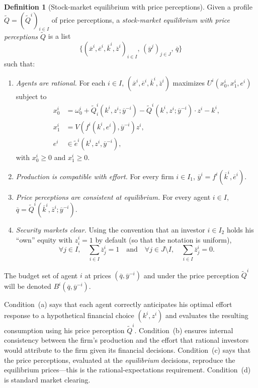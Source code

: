\documentclass[11pt,a4paper,oneside]{book}
\def\geq{\geqslant}
\def\et{\quad \text{and} \quad}
\theoremstyle{plain}
\theoremstyle{definition}
\newtheorem{definition}[theorem]{Definition}
\theoremstyle{remark}
\numberwithin{equation}{chapter}
\begin{document}
\begin{definition}[Stock-market equilibrium with price perceptions]\label{def:eq-PP}
Given a profile $\widetilde{Q} = (\widetilde{Q}^i)_{i \in I}$ of price perceptions, a \emph{stock-market equilibrium with price perceptions $\widetilde{Q}$} is a list
\begin{equation*}
  \bigl\{ (\overline{x}^i, \overline{e}^i, \overline{k}^i, \overline{z}^i)_{i \in I}, \, (\overline{y}^j)_{j \in J}, \, \overline{q} \bigr\}
\end{equation*}
such that:
\begin{enumerate}
  \item[(a)] \emph{Agents are rational.}
  For each $i \in I$, $(\overline{x}^i, \overline{e}^i, \overline{k}^i, \overline{z}^i)$ maximizes $U^i(x^i_0, x^i_1, e^i)$ subject to
  \begin{align*}
    x^i_0 &= \omega^i_0 + \widetilde{Q}^i_i(k^i, z^i; \overline{y}^{-i}) - \widetilde{Q}^i(k^i, z^i; \overline{y}^{-i}) \cdot z^i - k^i, \\
    x^i_1 &= V(f^i(k^i, e^i), \overline{y}^{-i}) z^i, \\
    e^i &\in \widetilde{e}^i(k^i, z^i, \overline{y}^{-i}),
  \end{align*}
  with $x^i_0 \geq 0$ and $x^i_1 \geq 0$.
  \item[(b)] \emph{Production is compatible with effort.}
  For every firm $i \in I_1$, $\overline{y}^i = f^i(\overline{k}^i, \overline{e}^i)$.
  \item[(c)] \emph{Price perceptions are consistent at equilibrium.}
  For every agent $i \in I$, $\overline{q} = \widetilde{Q}^i(\overline{k}^i, \overline{z}^i; \overline{y}^{-i})$.
  \item[(d)] \emph{Security markets clear.}
  Using the convention that an investor $i \in I_2$ holds his ``own'' equity with $z^i_i = 1$ by default (so that the notation is uniform),
  \begin{equation*}
    \forall j \in I, \quad \sum_{i \in I} \overline{z}^i_j = 1
    \et
    \forall j \in J \setminus I, \quad \sum_{i \in I} \overline{z}^i_j = 0.
  \end{equation*}
\end{enumerate}
\end{definition}

The budget set of agent $i$ at prices $(\overline{q}, \overline{y}^{-i})$ and under the price perception $\widetilde{Q}^i$ will be denoted $B^i(\overline{q}, \overline{y}^{-i})$.

Condition~(a) says that each agent correctly anticipates his optimal effort response to a hypothetical financial choice $(k^i, z^i)$ and evaluates the resulting consumption using his price perception $\widetilde{Q}^i$.
Condition~(b) ensures internal consistency between the firm's production and the effort that rational investors would attribute to the firm given its financial decisions.
Condition~(c) says that the price perceptions, evaluated at the \emph{equilibrium} decisions, reproduce the equilibrium prices---this is the rational-expectations requirement.
Condition~(d) is standard market clearing.
\end{document}
